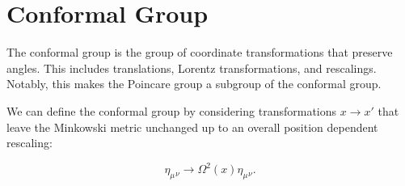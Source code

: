\chapter{Conformal Group}

The conformal group is the group of coordinate transformations that preserve
angles. This includes translations, Lorentz transformations, and rescalings.
Notably, this makes the Poincare group a subgroup of the conformal group.

We can define the conformal group by considering transformations $x \rightarrow
x'$ that leave the Minkowski metric unchanged up to an overall position
dependent rescaling:

\[
\eta_\mu{}_\nu \rightarrow \Omega^2(x)\eta_\mu{}_\nu
.\]
